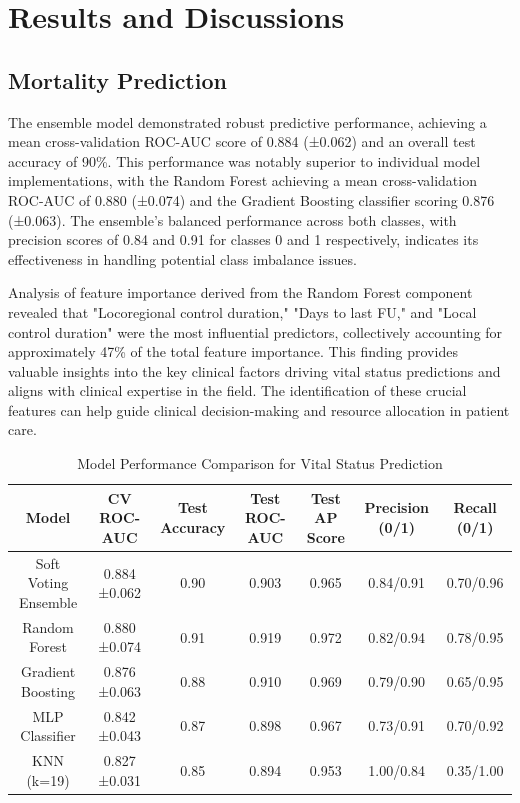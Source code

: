 \documentclass[conference]{IEEEtran}
\begin{document}
\section{Results and Discussions}

\subsection{Mortality Prediction}
The ensemble model demonstrated robust predictive performance, achieving a mean cross-validation ROC-AUC score of 0.884 (±0.062) and an overall test accuracy of 90\%. This performance was notably superior to individual model implementations, with the Random Forest achieving a mean cross-validation ROC-AUC of 0.880 (±0.074) and the Gradient Boosting classifier scoring 0.876 (±0.063). The ensemble's balanced performance across both classes, with precision scores of 0.84 and 0.91 for classes 0 and 1 respectively, indicates its effectiveness in handling potential class imbalance issues.

Analysis of feature importance derived from the Random Forest component revealed that "Locoregional control duration," "Days to last FU," and "Local control duration" were the most influential predictors, collectively accounting for approximately 47\% of the total feature importance. This finding provides valuable insights into the key clinical factors driving vital status predictions and aligns with clinical expertise in the field. The identification of these crucial features can help guide clinical decision-making and resource allocation in patient care.

\begin{table}[ht]
\centering
\caption{Model Performance Comparison for Vital Status Prediction}
\begin{tabular}{|c|c|c|c|c|c|c|}
\hline
\textbf{Model} & \textbf{CV ROC-AUC} & \textbf{Test Accuracy} & \textbf{Test ROC-AUC} & \textbf{Test AP Score} & \textbf{Precision (0/1)} & \textbf{Recall (0/1)} \\ \hline
Soft Voting Ensemble & 0.884 ±0.062 & 0.90 & 0.903 & 0.965 & 0.84/0.91 & 0.70/0.96 \\ \hline
Random Forest & 0.880 ±0.074 & 0.91 & 0.919 & 0.972 & 0.82/0.94 & 0.78/0.95 \\ \hline
Gradient Boosting & 0.876 ±0.063 & 0.88 & 0.910 & 0.969 & 0.79/0.90 & 0.65/0.95 \\ \hline
MLP Classifier & 0.842 ±0.043& 0.87 & 0.898 & 0.967 & 0.73/0.91 & 0.70/0.92 \\ \hline
KNN (k=19) & 0.827 ±0.031 & 0.85 & 0.894 & 0.953 & 1.00/0.84 & 0.35/1.00 \\ \hline
\end{tabular}
\label{vital_status_model_eval}
\end{table}
\end{document}
